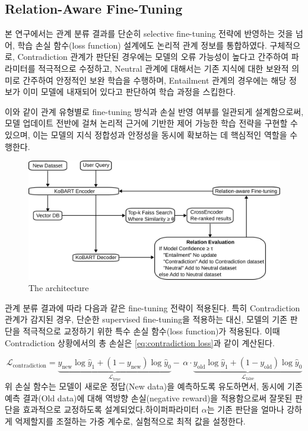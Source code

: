 \documentclass[a4paper,fleqn]{cas-sc}
\begin{document}
\subsection{Relation-Aware Fine-Tuning}
   
본 연구에서는 관계 분류 결과를 단순히 selective fine-tuning 전략에 반영하는 것을 넘어, 학습 손실 함수(loss function) 설계에도 논리적 관계 정보를 통합하였다. 구체적으로, Contradiction 관계가 판단된 경우에는 모델의 오류 가능성이 높다고 간주하여 파라미터를 적극적으로 수정하고, Neutral 관계에 대해서는 기존 지식에 대한 보완적 의미로 간주하여 안정적인 보완 학습을 수행하며, Entailment 관계의 경우에는 해당 정보가 이미 모델에 내재되어 있다고 판단하여 학습 과정을 스킵한다.

이와 같이 관계 유형별로 fine-tuning 방식과 손실 반영 여부를 일관되게 설계함으로써, 모델 업데이트 전반에 걸쳐 논리적 근거에 기반한 제어 가능한 학습 전략을 구현할 수 있으며, 이는 모델의 지식 정합성과 안정성을 동시에 확보하는 데 핵심적인 역할을 수행한다.
\begin{figure}[htbp]
    \centering
    \includegraphics[width=\textwidth]{flow.png}
    \caption{The architecture }
\end{figure}


관계 분류 결과에 따라 다음과 같은 fine-tuning 전략이 적용된다. 특히 Contradiction 관계가 감지된 경우, 단순한 supervised fine-tuning을 적용하는 대신, 모델의 기존 판단을 적극적으로 교정하기 위한 특수 손실 함수(loss function)가 적용된다. 이때 Contradiction 상황에서의 총 손실은 \cref{eq:contradiction loss}과 같이 계산된다.

    

\begin{equation}
    \mathcal{L}_{\text{contradiction}} =
    \underbrace{y_{\text{new}} \log \hat{y}_1 + (1 - y_{\text{new}}) \log \hat{y}_0 }_{\mathcal{L}_{\text{true}}}
    -\, \alpha \cdot
    \underbrace{ y_{\text{old}} \log \hat{y}_1 + (1 - y_{\text{old}}) \log \hat{y}_0 }_{\mathcal{L}_{\text{false}}}
    \label{eq:contradiction loss}
\end{equation}
위 손실 함수는 모델이 새로운 정답(New data)을 예측하도록 유도하면서, 동시에 기존 예측 결과(Old data)에 대해 역방향 손실(negative reward)을 적용함으로써 잘못된 판단을 효과적으로 교정하도록 설계되었다.하이퍼파라미터 $α$는 기존 판단을 얼마나 강하게 억제할지를 조절하는 가중 계수로, 실험적으로 최적 값을 설정한다.
        
\end{document}
